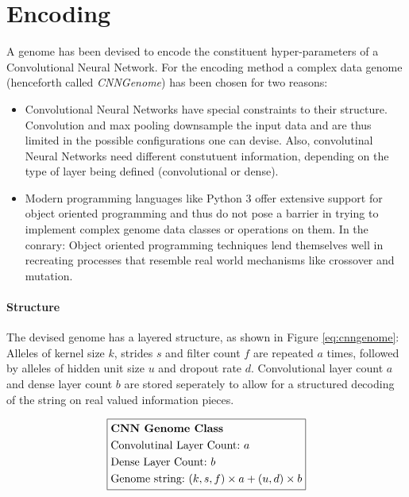 \documentclass[11pt,a4paper,twoside,openright]{scrbook}
\begin{document}
\section{Encoding}
A genome has been devised to encode the constituent hyper-parameters of a Convolutional Neural Network.
For the encoding method a complex data genome (henceforth called \emph{CNNGenome}) has been chosen for two reasons:
\begin{itemize}
  \item Convolutional Neural Networks have special constraints to their structure. Convolution and max pooling downsample the input data and are thus limited in the possible configurations one can devise. Also, convolutinal Neural Networks need different constutuent information, depending on the type of layer being defined (convolutional or dense).
  \item Modern programming languages like Python 3 offer extensive support for object oriented programming and thus do not pose a barrier in trying to implement complex genome data classes or operations on them. In the conrary: Object oriented programming techniques lend themselves well in recreating processes that resemble real world mechanisms like crossover and mutation.
\end{itemize}

\paragraph{Structure}

The devised genome has a layered structure, as shown in Figure \ref{eq:cnngenome}: Alleles of kernel size \(k\), strides \(s\) and filter count \(f\) are repeated \(a\) times, followed by alleles of hidden unit size \(u\) and dropout rate \(d\). Convolutional layer count \(a\) and dense layer count \(b\) are stored seperately to allow for a structured decoding of the string on real valued information pieces.

\begin{equation} \label{eq:cnngenome}
  \boxed{
    \begin{aligned}
    & \text{\textbf{CNN\ Genome\ Class}} \\
    & \text{Convolutinal\ Layer\ Count:}\ a \\
    & \text{Dense\ Layer\ Count:}\ b \\
    & \text{Genome\ string:}\ (k, s, f) \times a + (u, d) \times b
  \end{aligned}
  }
\end{equation}
\end{document}
